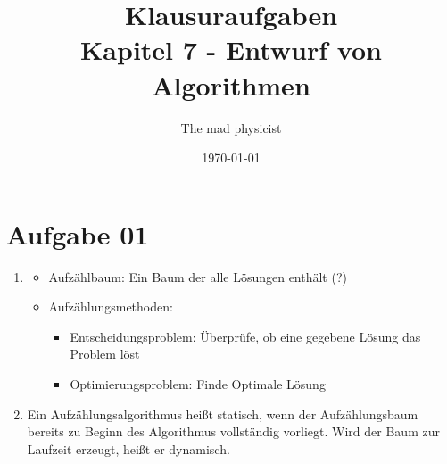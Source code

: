 \documentclass[10pt,a4paper]{article}
\begin{document}
\title{Klausuraufgaben \\
\small{Kapitel 7 - Entwurf von Algorithmen}}
\author{The mad physicist}
\date{\today}
\maketitle

\section*{Aufgabe 01}
    \begin{enumerate}[label={\alph*)}]
        \item
            \begin{itemize}
                \item Aufz\"ahlbaum: Ein Baum der alle L\"osungen
                    enth\"alt (?)
                \item Aufz\"ahlungsmethoden: \\
                    \begin{itemize}
                        \item Entscheidungsproblem: 
                            \"Uberpr\"ufe, ob eine 
                            gegebene L\"osung das
                            Problem l\"ost
                        \item Optimierungsproblem:
                            Finde Optimale L\"osung
                    \end{itemize}

            \end{itemize}

        \item Ein Aufz\"ahlungsalgorithmus hei\ss t statisch, wenn der
            Aufz\"ahlungsbaum bereits zu Beginn des Algorithmus vollst\"andig 
            vorliegt. Wird der Baum zur Laufzeit erzeugt, hei\ss t er dynamisch.
    \end{enumerate}
    
\end{document}
